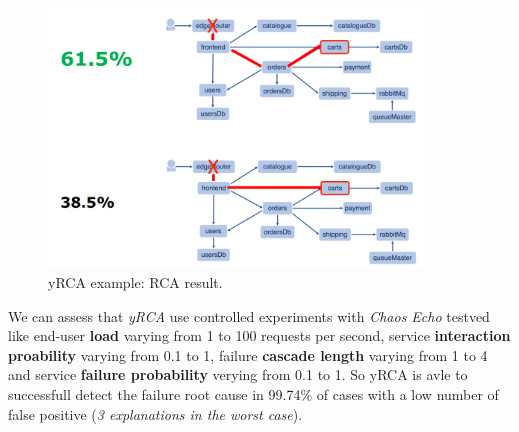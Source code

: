 \documentclass[10pt,a4paper]{report}
\begin{document}
\begin{figure}[h]
	\centering
	\includegraphics[width=0.9\textwidth]{image-yRCA-result}
	\caption{yRCA example: RCA result.}
	\label{image-yRCA-result}
\end{figure}

We can assess that \textit{yRCA} use controlled experiments with \textit{Chaos Echo} testved like end-user \textbf{load} varying from 1 to 100 requests per second, service \textbf{interaction proability} varying from 0.1 to 1, failure \textbf{cascade length} varying from 1 to 4 and service \textbf{failure probability} verying from 0.1 to 1. So yRCA is avle to successfull detect the failure root cause in 99.74\% of cases with a low number of false positive (\textit{3 explanations in the worst case}). 
\end{document}
